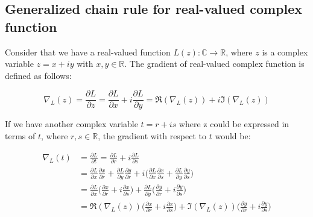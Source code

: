 \subsection{Generalized chain rule for real-valued complex  function}\label{cchainrule}
Consider that we have a real-valued function $L(z): \mathbb{C}\rightarrow\mathbb{R}$, where $z$ is a complex variable $z=x+iy$ with $x,y \in \mathbb{R}$. The gradient of real-valued complex function is defined as follows:
 
\begin{equation}\label{cvgrad}
\nabla_{L}(z) = \frac{\partial L}{\partial z} = \frac{\partial L}{\partial x} + i\frac{\partial L}{\partial y} = \Re(\nabla_{L}(z))+i\Im(\nabla_{L}(z))
\end{equation}

If we have another complex variable $t=r+is$ where z could be expressed in terms of $t$, where $r,s \in \mathbb{R}$, the gradient with respect to $t$ would be:

\begin{equation}\label{chainchainchain}
\begin{aligned}
\nabla_{L}(t) &= \frac{\partial L}{\partial t} = \frac{\partial L}{\partial r} + i\frac{\partial L}{\partial s}\\
&= \frac{\partial L}{\partial x}\frac{\partial x}{\partial r} + \frac{\partial L}{\partial y}\frac{\partial y}{\partial r}+i\bigg(\frac{\partial L}{\partial x}\frac{\partial x}{\partial s}+\frac{\partial L}{\partial y}\frac{\partial y}{\partial s}\bigg)\\
&= \frac{\partial L}{\partial x}\bigg(\frac{\partial x}{\partial r}+i\frac{\partial x}{\partial s}\bigg)+\frac{\partial L}{\partial y}\bigg(\frac{\partial y}{\partial r}+i\frac{\partial y}{\partial s}\bigg)\\
&= \Re(\nabla_{L}(z))\bigg(\frac{\partial x}{\partial r}+i\frac{\partial x}{\partial s}\bigg)+\Im(\nabla_{L}(z))\bigg(\frac{\partial y}{\partial r}+i\frac{\partial y}{\partial s}\bigg)
\end{aligned}
\end{equation}






